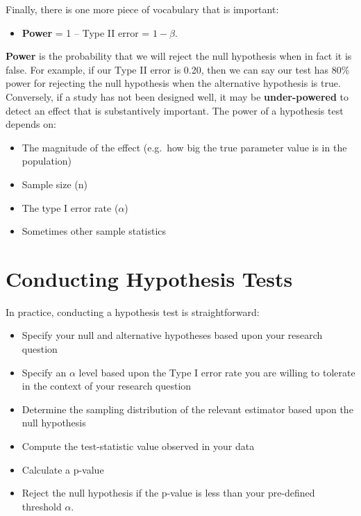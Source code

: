 \documentclass[
  letterpaper,
  DIV=11,
  numbers=noendperiod]{scrreprt}
\providecommand{\tightlist}{%
  \setlength{\itemsep}{0pt}\setlength{\parskip}{0pt}}\usepackage{longtable,booktabs,array}
\theoremstyle{definition}
\theoremstyle{remark}
\begin{document}
Finally, there is one more piece of vocabulary that is important:

\begin{itemize}
\tightlist
\item
  \textbf{Power} = 1 -- Type II error = \(1-\beta\).
\end{itemize}

\textbf{Power} is the probability that we will reject the null
hypothesis when in fact it is false. For example, if our Type II error
is 0.20, then we can say our test has 80\% power for rejecting the null
hypothesis when the alternative hypothesis is true. Conversely, if a
study has not been designed well, it may be \textbf{under-powered} to
detect an effect that is substantively important. The power of a
hypothesis test depends on:

\begin{itemize}
\tightlist
\item
  The magnitude of the effect (e.g.~how big the true parameter value is
  in the population)
\item
  Sample size (n)
\item
  The type I error rate (\(\alpha\))
\item
  Sometimes other sample statistics
\end{itemize}

\hypertarget{sec-two-tailed}{%
\section{Conducting Hypothesis Tests}\label{sec-two-tailed}}

In practice, conducting a hypothesis test is straightforward:

\begin{itemize}
\tightlist
\item
  Specify your null and alternative hypotheses based upon your research
  question
\item
  Specify an \(\alpha\) level based upon the Type I error rate you are
  willing to tolerate in the context of your research question
\item
  Determine the sampling distribution of the relevant estimator based
  upon the null hypothesis
\item
  Compute the test-statistic value observed in your data
\item
  Calculate a p-value
\item
  Reject the null hypothesis if the p-value is less than your
  pre-defined threshold \(\alpha\).
\end{itemize}
\end{document}
